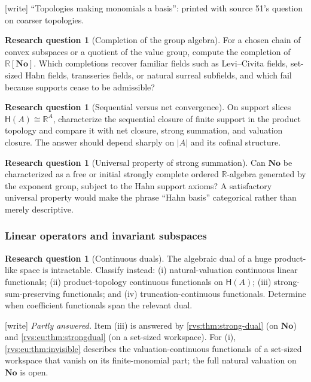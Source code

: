 \documentclass[11pt,letterpaper]{article}
\numberwithin{equation}{section}
\theoremstyle{definition}
\newtheorem{question}[theorem]{Research question}
\theoremstyle{remark}
\newcommand{\No}{\mathbf{No}}
\newcommand{\R}{\mathbb{R}}
\newcommand{\Hahn}{\mathsf{H}}
\newcommand{\wtag}{\textup{[write]}}%
\begin{document}
\noindent\wtag{} ``Topologies making monomials a basis'': printed with source
51's question on coarser topologies.

\begin{question}[Completion of the group algebra]
For a chosen chain of convex subspaces or a quotient of the value group, compute
the completion of $\R[\No]$. Which completions recover familiar fields such as
Levi--Civita fields, set-sized Hahn fields, transseries fields, or natural surreal
subfields, and which fail because supports cease to be admissible?
\end{question}

\begin{question}[Sequential versus net convergence]
On support slices $\Hahn(A)\cong\R^A$, characterize the sequential closure of finite
support in the product topology and compare it with net closure, strong summation,
and valuation closure. The answer should depend sharply on $|A|$ and its cofinal
structure.
\end{question}

\begin{question}[Universal property of strong summation]
Can $\No$ be characterized as a free or initial strongly complete ordered
$\R$-algebra generated by the exponent group, subject to the Hahn support axioms?
A satisfactory universal property would make the phrase ``Hahn basis'' categorical
rather than merely descriptive.
\end{question}

\subsubsection{Linear operators and invariant subspaces}

\begin{question}[Continuous duals]
The algebraic dual of a huge product-like space is intractable. Classify instead:
(i) natural-valuation continuous linear functionals; (ii) product-topology
continuous functionals on $\Hahn(A)$; (iii) strong-sum-preserving functionals; and
(iv) truncation-continuous functionals. Determine when coefficient functionals span
the relevant dual.
\end{question}

\noindent\wtag{} \emph{Partly answered.}  Item (iii) is answered by
\cref{rvs:thm:strong-dual} (on \(\No\)) and \cref{rvs:eu:thm:strongdual} (on a
set-sized workspace).  For (i), \cref{rvs:eu:thm:invisible} describes the
valuation-continuous functionals of a set-sized workspace that vanish on
its finite-monomial part; the full natural valuation on \(\No\) is open.
\end{document}

